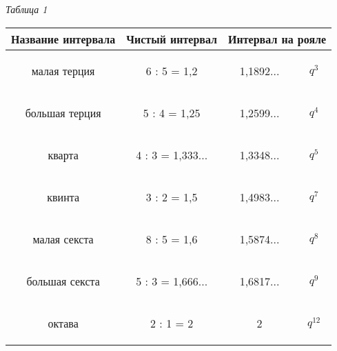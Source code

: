 


% 
    
\begin{flushleft}
    \textit{Таблица 1}
\end{flushleft}

\noindent\begin{tabular}{|c|c|c|c|} 
    
    \hline 
    Название интервала & Чистый интервал & 
    \multicolumn{2}{c|}{Интервал на рояле} \\
    \hline
    \begin{flushleft}
        малая терция
    \end{flushleft}
         & 6 : 5 = 1,2 & 1,1892... & $q^3$ \\
    \hline
    \begin{flushleft}
        большая терция 
    \end{flushleft}
        & 5 : 4 = 1,25 & 1,2599... & $q^4$ \\
    \hline 
    \begin{flushleft}
        кварта     
    \end{flushleft}
    & 4 : 3 = 1,333... & 1,3348... & $q^5$ \\
    \hline
    \begin{flushleft}
        квинта
    \end{flushleft}
    & 3 : 2 = 1,5 & 1,4983... & $q^7$ \\
    \hline 
    \begin{flushleft}
        малая секста     
    \end{flushleft}
    & 8 : 5 = 1,6 & 1,5874... & $q ^ 8$ \\
    \hline 
    \begin{flushleft}
        большая секста     
    \end{flushleft}
    & 5 : 3 = 1,666... & 1,6817... & $q^9$ \\
    \hline 
    \begin{flushleft}
        октава     
    \end{flushleft}
    & 2 : 1 = 2 & 2 & $q^{12}$ \\
    \hline
     
\end{tabular}
    
% 
